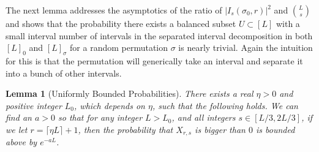 \documentclass[11pt,a4paper]{amsart}
\newtheorem{lemma}[theorem]{Lemma}
\theoremstyle{definition}
\theoremstyle{remark}
\begin{document}
The next lemma addresses the asymptotics of the ratio of $|I_{s}(\sigma_{0},r)|^{2}$ and $\binom{L}{s}$ and shows that the probability there exists a balanced subset $U \subset [L]$ with a small interval number of intervals in the separated interval decomposition in both $[L]_{0}$ and $[L]_{\sigma}$ for a random permutation $\sigma$ is nearly trivial.  Again the intuition for this is that the permutation will generically take an interval and separate it into a bunch of other intervals.

\begin{lemma}[Uniformly Bounded Probabilities]\label{lem:estimate_prob}
There exists a real $\eta > 0$ and positive integer $L_{0}$, which depends on $\eta$, such that the following holds.  We can find an $a > 0$ so that for any integer $L > L_{0}$, and all integers $s \in [L/3,2L/3]$, if we let $r = \lceil \eta L \rceil + 1$, then the probability that $X_{r,s}$ is bigger than $0$ is bounded above by $e^{-aL}$. 
\end{lemma}
\end{document}
